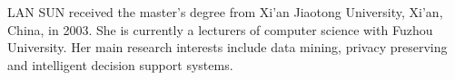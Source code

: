\documentclass{ieeeaccess}
\begin{document}
\begin{IEEEbiography}{LAN SUN}
    received the master’s degree from Xi’an Jiaotong University, Xi’an, China, in 2003.
    She is currently a lecturers of computer science with Fuzhou University.
    Her main research interests include data mining, privacy preserving and intelligent decision support systems.
\end{IEEEbiography}


\EOD
\end{document}
